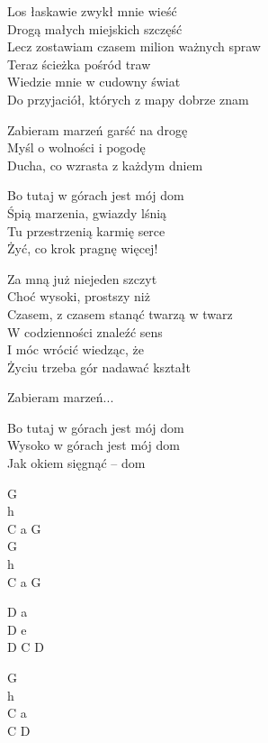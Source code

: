 \begin{text}
    Los łaskawie zwykł mnie wieść\\
    Drogą małych miejskich szczęść\\
    Lecz zostawiam czasem milion ważnych spraw\\
    Teraz ścieżka pośród traw\\
    Wiedzie mnie w cudowny świat\\
    Do przyjaciół, których z mapy dobrze znam

    \vin Zabieram marzeń garść na drogę\\
    \vin Myśl o wolności i pogodę\\
    \vin Ducha, co wzrasta z każdym dniem

    \vin Bo tutaj w górach jest mój dom\\
    \vin Śpią marzenia, gwiazdy lśnią\\
    \vin Tu przestrzenią karmię serce\\
    \vin Żyć, co krok pragnę więcej!

    Za mną już niejeden szczyt\\
    Choć wysoki, prostszy niż\\
    Czasem, z czasem stanąć twarzą w twarz\\
    W codzienności znaleźć sens\\
    I móc wrócić wiedząc, że\\
    Życiu trzeba gór nadawać kształt

    \vin Zabieram marzeń...

    \vin Bo tutaj w górach jest mój dom\\
    \vin Wysoko w górach jest mój dom\\
    \vin Jak okiem sięgnąć – dom
\end{text}
\begin{chord}
    G\\
    h\\
    C a G\\
    G\\
    h\\
    C a G

    D a\\
    D e\\
    D C D

    G\\
    h\\
    C a\\
    C D
\end{chord}
